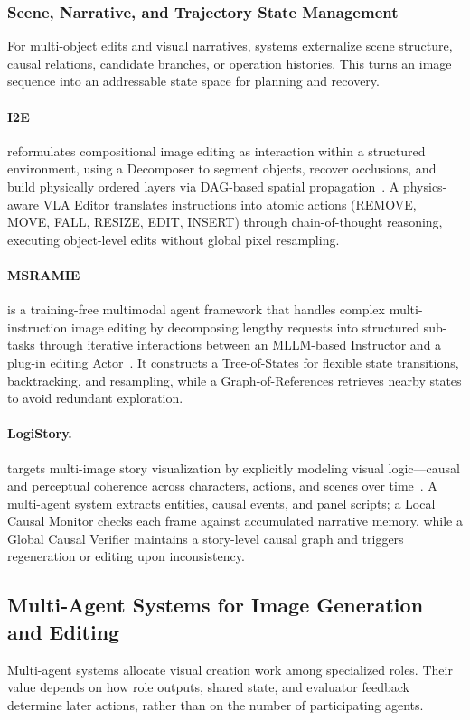 \subsubsection{Scene, Narrative, and Trajectory State Management}
For multi-object edits and visual narratives, systems externalize scene structure, causal relations, candidate branches, or operation histories. This turns an image sequence into an addressable state space for planning and recovery.

\paragraph{I2E}
 reformulates compositional image editing as interaction within a structured environment, using a Decomposer to segment objects, recover occlusions, and build physically ordered layers via DAG-based spatial propagation~\cite{avg260103741}. A physics-aware VLA Editor translates instructions into atomic actions (REMOVE, MOVE, FALL, RESIZE, EDIT, INSERT) through chain-of-thought reasoning, executing object-level edits without global pixel resampling.

\paragraph{MSRAMIE}
 is a training-free multimodal agent framework that handles complex multi-instruction image editing by decomposing lengthy requests into structured sub-tasks through iterative interactions between an MLLM-based Instructor and a plug-in editing Actor~\cite{avg260316967}. It constructs a Tree-of-States for flexible state transitions, backtracking, and resampling, while a Graph-of-References retrieves nearby states to avoid redundant exploration. 

\paragraph{LogiStory.}
 targets multi-image story visualization by explicitly modeling visual logic—causal and perceptual coherence across characters, actions, and scenes over time~\cite{avg260328082}. A multi-agent system extracts entities, causal events, and panel scripts; a Local Causal Monitor checks each frame against accumulated narrative memory, while a Global Causal Verifier maintains a story-level causal graph and triggers regeneration or editing upon inconsistency.

\subsection{Multi-Agent Systems for Image Generation and Editing}
Multi-agent systems allocate visual creation work among specialized roles. Their value depends on how role outputs, shared state, and evaluator feedback determine later actions, rather than on the number of participating agents.

